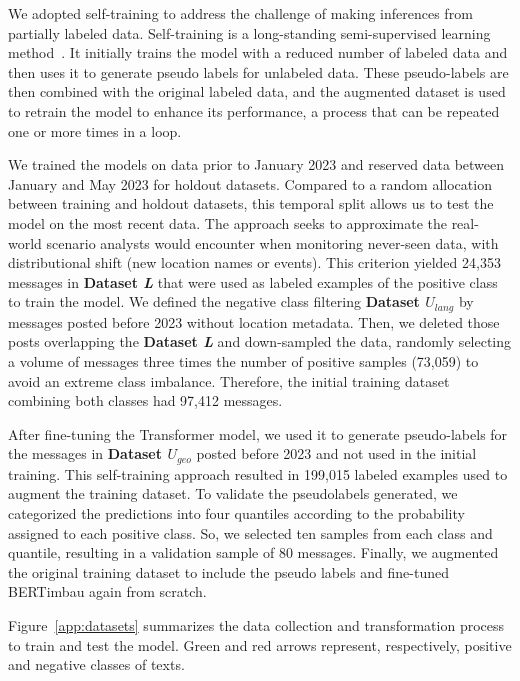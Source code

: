 \documentclass[11pt,letterpaper]{article}
\begin{document}
We adopted self-training to address the challenge of making inferences from partially labeled data. Self-training is a long-standing semi-supervised learning method~\citep{aminiSelfTrainingSurvey2022}. It initially trains the model with a reduced number of labeled data and then uses it to generate pseudo labels for unlabeled data. These pseudo-labels are then combined with the original labeled data, and the augmented dataset is used to retrain the model to enhance its performance, a process that can be repeated one or more times in a loop.  

We trained the models on data prior to January 2023 and reserved data between January and May 2023 for holdout datasets. Compared to a random allocation between training and holdout datasets, this temporal split allows us to test the model on the most recent data. The approach seeks to approximate the real-world scenario analysts would encounter when monitoring never-seen data, with distributional shift (new location names or events). This criterion yielded 24,353 messages in \textbf{Dataset \textit{L}} that were used as labeled examples of the positive class to train the model. We defined the negative class filtering \textbf{Dataset $U_{lang}$} by messages posted before 2023 without location metadata. Then, we deleted those posts overlapping the \textbf{Dataset \textit{L}} and down-sampled the data, randomly selecting a volume of messages three times the number of positive samples (73,059) to avoid an extreme class imbalance. Therefore, the initial training dataset combining both classes had 97,412 messages.

After fine-tuning the Transformer model, we used it to generate pseudo-labels for the messages in \textbf{Dataset $U_{geo}$} posted before 2023 and not used in the initial training. This self-training approach resulted in 199,015 labeled examples used to augment the training dataset. To validate the pseudolabels generated, we categorized the predictions into four quantiles according to the probability assigned to each positive class. So, we selected ten samples from each class and quantile, resulting in a validation sample of 80 messages. Finally, we augmented the original training dataset to include the pseudo labels and fine-tuned BERTimbau again from scratch.

Figure~\ref{app:datasets} summarizes the data collection and transformation process to train and test the model. Green and red arrows represent, respectively, positive and negative classes of texts. 
\end{document}
